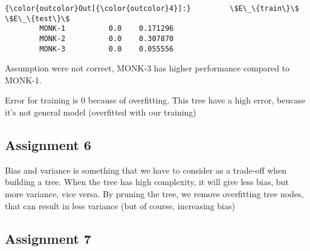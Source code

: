 \documentclass[11pt]{article}
\begin{document}
\begin{Verbatim}[commandchars=\\\{\}]
{\color{outcolor}Out[{\color{outcolor}4}]:}         \$E\_\{train\}\$  \$E\_\{test\}\$
        MONK-1          0.0    0.171296
        MONK-2          0.0    0.307870
        MONK-3          0.0    0.055556
\end{Verbatim}
            
    Assumption were not correct, MONK-3 has higher performance compared to
MONK-1.

Error for training is 0 because of overfitting. This tree have a high
error, beucase it's not general model (overfitted with our training)

    \hypertarget{assignment-6}{%
\subsection{Assignment 6}\label{assignment-6}}

    Bias and variance is something that we have to consider as a trade-off
when building a tree. When the tree has high complexity, it will give
less bias, but more variance, vice versa. By pruning the tree, we remove
overfitting tree nodes, that can result in less variance (but of course,
increasing bias)

    \hypertarget{assignment-7}{%
\subsection{Assignment 7}\label{assignment-7}}
\end{document}
